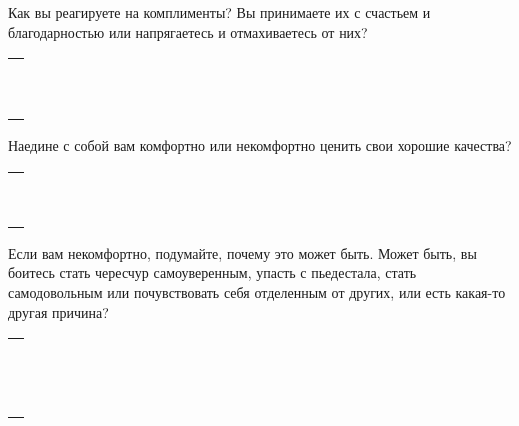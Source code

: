 \begin{itemize}
	\itemWritingHand Как вы реагируете на комплименты? Вы принимаете их с счастьем и благодарностью или напрягаетесь и отмахиваетесь от них?
\end{itemize}
\setlength{\extrarowheight}{2mm}
\begin{tabularx}{\textwidth}{X}
	\\
	\arrayrulecolor{gray}\hline\\
	\hline\\
	\hline\\
	\hline\\
	\hline\\
	\hline\\	
	\hline\\
	\hline\\
	\hline\\
	\hline\\
	\hline\\
\end{tabularx}
\setlength{\extrarowheight}{0mm}
\begin{itemize}
	\itemWritingHand Наедине с собой вам комфортно или некомфортно ценить свои хорошие качества?
\end{itemize}
\setlength{\extrarowheight}{2mm}
\begin{tabularx}{\textwidth}{X}
	\\
	\arrayrulecolor{gray}\hline\\
	\hline\\
	\hline\\
	\hline\\
	\hline\\
	\hline\\	
	\hline\\
	\hline\\
	\hline\\
	\hline\\
\end{tabularx}
\setlength{\extrarowheight}{0mm}
\begin{itemize}
	\itemWritingHand Если вам некомфортно, подумайте, почему это может быть. Может быть, вы боитесь стать чересчур самоуверенным, упасть с пьедестала, стать самодовольным или почувствовать себя отделенным от других, или есть какая-то другая причина?
\end{itemize}
\setlength{\extrarowheight}{2mm}
\begin{tabularx}{\textwidth}{X}
	\\
	\arrayrulecolor{gray}\hline\\
	\hline\\
	\hline\\
	\hline\\
	\hline\\
	\hline\\	
	\hline\\
	\hline\\
	\hline\\
	\hline\\
	\hline\\
	\hline\\
	\hline\\
	\hline\\
\end{tabularx}
\setlength{\extrarowheight}{0mm}

